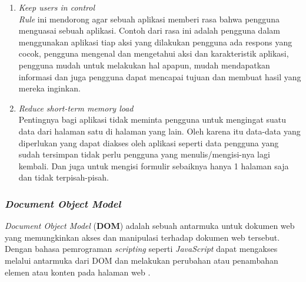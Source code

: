 \documentclass[a4paper]{article}
\newcommand{\subsubbab}[1]{%
    \subsubsection{#1}%
}
\begin{document}
\begin{enumerate}
    \item \textit{Keep users in control}\\
    \textit{Rule} ini mendorong agar sebuah aplikasi memberi rasa bahwa pengguna menguasai sebuah aplikasi. Contoh dari rasa ini adalah pengguna dalam menggunakan aplikasi tiap aksi yang dilakukan pengguna ada respons yang cocok, pengguna mengenal dan mengetahui aksi dan karakteristik aplikasi, pengguna mudah untuk melakukan hal apapun, mudah mendapatkan informasi dan juga pengguna dapat mencapai tujuan dan membuat hasil yang mereka inginkan.
    \item \textit{Reduce short-term memory load}\\
    Pentingnya bagi aplikasi tidak meminta pengguna untuk mengingat suatu data dari halaman satu di halaman yang lain. Oleh karena itu data-data yang diperlukan yang dapat diakses oleh aplikasi seperti data pengguna yang sudah tersimpan tidak perlu pengguna yang menulis/mengisi-nya lagi kembali. Dan juga untuk mengisi formulir sebaiknya hanya 1 halaman saja dan tidak terpisah-pisah.
\end{enumerate}

\subsubbab{\textit{Document Object Model}}
\textit{Document Object Model} (\textbf{DOM}) adalah sebuah antarmuka untuk dokumen web yang memungkinkan akses dan manipulasi terhadap dokumen web tersebut. Dengan bahasa pemrograman \textit{scripting} seperti \textit{JavaScript} dapat mengakses melalui antarmuka dari DOM dan melakukan perubahan atau penambahan elemen atau konten pada halaman web \autocite{DOM_teori}.
\end{document}
